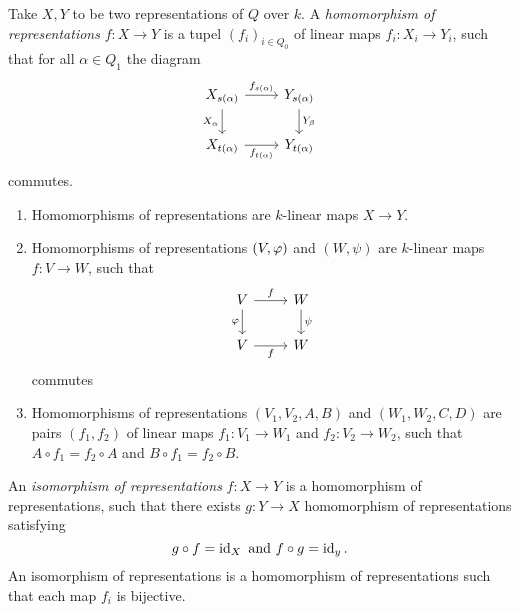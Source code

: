 \begin{defn}
  Take $X,Y$ to be two representations of $Q$ over $k$. A \emph{homomorphism of representations}  $f:X\to Y$ is a tupel $(f_i)_{i\in Q_0}$ of linear maps $f_i:X_i\to Y_i$, such that for all $\alpha \in Q_1$ the diagram
  \[
  \begin{tikzcd}
    X_{s(\alpha)}\ar{r}{f_{s(\alpha)}} \ar[swap]{d}{X_\alpha}&Y_{s(\alpha)}\ar{d}{Y_{\beta}}\\
    X_{t(\alpha)}\ar[swap]{r}{f_{t(\alpha)}} & Y_{t(\alpha)}
  \end{tikzcd}
  \] commutes.
\end{defn}
\begin{bsp}
  \begin{enumerate}
    \item Homomorphisms of representations are $k$-linear maps $X\to Y$.
    \item Homomorphisms of representations $(V,\varphi)$ and $(W,\psi)$ are $k$-linear maps $f:V\to W$, such that
    \[
    \begin{tikzcd}
      V\ar{r}{f}\ar[swap]{d}{\pphi}&W\ar{d}{\psi}\\
      V\ar[swap]{r}{f}&W
    \end{tikzcd}
  \] commutes
    \item Homomorphisms of representations $(V_1,V_2,A,B)$ and $(W_1,W_2,C,D)$ are pairs $(f_1,f_2)$ of linear maps $f_1:V_1\to W_1$ and $f_2:V_2\to W_2$, such that $A\circ f_1=f_2\circ A$ and $B\circ f_1=f_2\circ B$.
  \end{enumerate}
\end{bsp}
\begin{defn}
  An \emph{isomorphism of representations} $f:X\to Y$ is a homomorphism of representations, such that there exists $g:Y\to X$ homomorphism of representations satisfying
  \[
  g\circ f=\operatorname{id}_X~\text{and}~f\circ g=\operatorname{id}_y.
  \]
  An isomorphism of representations is a homomorphism of representations such that each map $f_i$ is bijective.

\end{defn}

\lec
